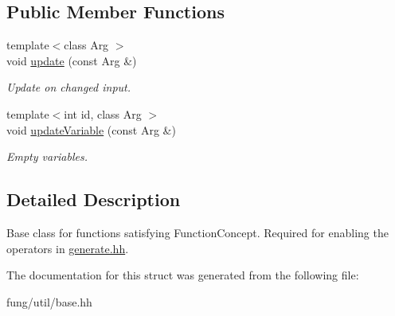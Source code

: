 \subsection*{Public Member Functions}
\begin{DoxyCompactItemize}
\item 
\hypertarget{structFunG_1_1Base_af999fe33451a4d02b7296758b1face5d}{{\footnotesize template$<$class Arg $>$ }\\void \hyperlink{structFunG_1_1Base_af999fe33451a4d02b7296758b1face5d}{update} (const Arg \&)}\label{structFunG_1_1Base_af999fe33451a4d02b7296758b1face5d}

\begin{DoxyCompactList}\small\item\em Update on changed input. \end{DoxyCompactList}\item 
\hypertarget{structFunG_1_1Base_aa87528c3cc5711d8645bd8f86333a07b}{{\footnotesize template$<$int id, class Arg $>$ }\\void \hyperlink{structFunG_1_1Base_aa87528c3cc5711d8645bd8f86333a07b}{update\-Variable} (const Arg \&)}\label{structFunG_1_1Base_aa87528c3cc5711d8645bd8f86333a07b}

\begin{DoxyCompactList}\small\item\em Empty variables. \end{DoxyCompactList}\end{DoxyCompactItemize}


\subsection{Detailed Description}
Base class for functions satisfying Function\-Concept. Required for enabling the operators in \hyperlink{generate_8hh_source}{generate.\-hh}. 

The documentation for this struct was generated from the following file\-:\begin{DoxyCompactItemize}
\item 
fung/util/base.\-hh\end{DoxyCompactItemize}
